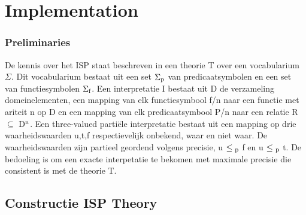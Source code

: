 \chapter{Implementation}
\label{cha:implementation}

\subsection{Preliminaries}
De kennis over het ISP staat beschreven in een theorie T over een vocabularium $\Sigma$. Dit vocabularium bestaat uit een set $\Sigma\textsubscript{p}$ van predicaatsymbolen en een set van functiesymbolen $\Sigma\textsubscript{f}$. Een interpretatie I bestaat uit D de verzameling domeinelementen, een mapping van elk functiesymbool f/n naar een functie met ariteit n op D en een mapping van elk predicaatsymbool P/n naar een relatie R $\subseteq$ D$\textsuperscript{n}$. Een three-valued parti\"{e}le interpretatie bestaat uit een mapping op drie waarheidswaarden {u,t,f} respectievelijk onbekend, waar en niet waar. De waarheidswaarden zijn partieel geordend volgens precisie, u $\leq\textsubscript{p}$ f en u $\leq\textsubscript{p}$ t. De bedoeling is om een exacte interpetatie te bekomen met maximale precisie die consistent is met de theorie T.

\section{Constructie ISP Theory}

